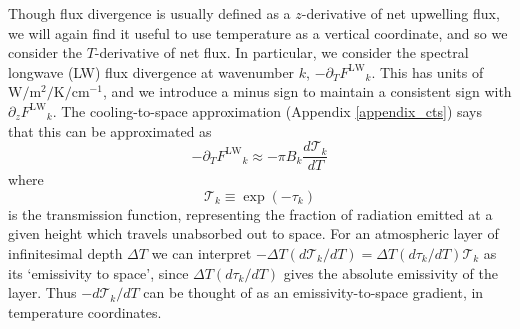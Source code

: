 \documentclass[10pt]{article}
\newcommand{\beqn}{\begin{equation}}
\newcommand{\eeqn}{\end{equation}}
\newcommand{\ppz}{\ensuremath{\partial_z}}
\newcommand{\ppt}{\ensuremath{\partial_T}}
\newcommand{\FLW}{\ensuremath{F^\mathrm{LW}}}
\newcommand{\trans}{\ensuremath{\mathcal{T}}}
\newcommand{\cminverse}{\ensuremath{\mathrm{cm^{-1}}}}
\newcommand{\tauk}{\ensuremath{\tau_k}}
\newcommand{\Wmsq}{\ensuremath{\mathrm{W/m^2}}}
\begin{document}
Though flux divergence is usually defined as a $z$-derivative of net upwelling flux, we will again find it useful to use temperature as a vertical coordinate, and so we consider the $T$-derivative of net flux. In particular, we consider the spectral longwave (LW) flux divergence at wavenumber $k$, $-\ppt \FLW_k$. This has units of $\Wmsq/\mathrm{K}/\cminverse$, and  we introduce a minus sign to maintain a consistent sign with  $\ppz \FLW_k$. The cooling-to-space approximation (Appendix \ref{appendix_cts}) says that this can be approximated as
	\beqn
		-\ppt \FLW_k \approx - \pi B_k \frac{d \trans_k}{dT}
	\label{cts_spectral}
	\eeqn
where  
	\beqn
		\trans_k\equiv \exp(-\tauk)
	\label{trans_def}
	\eeqn
	 is the transmission function,  representing the fraction of radiation emitted at a given height which travels unabsorbed out to space. For an atmospheric layer of infinitesimal depth $\Delta T$ we can interpret $-\Delta T(d\trans_k/dT)  = \Delta T (d \tauk/dT)\trans_k$ as its `emissivity to space', since $\Delta T(d \tauk/dT)$ gives the absolute  emissivity of the layer. Thus $-d\trans_k/dT$ can be thought of as an emissivity-to-space gradient, in temperature coordinates.
	 
	 
\end{document}
